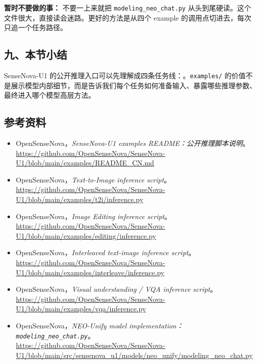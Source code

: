 \begin{warnbox}
\textbf{暂时不要做的事：} 不要一上来就把 \texttt{modeling\_neo\_chat.py} 从头到尾硬读。这个文件很大，直接读会迷路。更好的方法是从四个 example 的调用点切进去，每次只追一个任务路径。
\end{warnbox}

\subsection{九、本节小结}

\begin{summarybox}
SenseNova-U1 的公开推理入口可以先理解成四条任务线：。\texttt{examples/} 的价值不是展示模型内部细节，而是告诉我们每个任务如何准备输入、暴露哪些推理参数、最终进入哪个模型高层方法。
\end{summarybox}

\subsection{参考资料}

\begingroup
\small
\sloppy
\begin{itemize}[leftmargin=1.5em]
  \item OpenSenseNova，\emph{SenseNova-U1 examples README：公开推理脚本说明}。\\
  \url{https://github.com/OpenSenseNova/SenseNova-U1/blob/main/examples/README_CN.md}
  \item OpenSenseNova，\emph{Text-to-Image inference script}。\\
  \url{https://github.com/OpenSenseNova/SenseNova-U1/blob/main/examples/t2i/inference.py}
  \item OpenSenseNova，\emph{Image Editing inference script}。\\
  \url{https://github.com/OpenSenseNova/SenseNova-U1/blob/main/examples/editing/inference.py}
  \item OpenSenseNova，\emph{Interleaved text-image inference script}。\\
  \url{https://github.com/OpenSenseNova/SenseNova-U1/blob/main/examples/interleave/inference.py}
  \item OpenSenseNova，\emph{Visual understanding / VQA inference script}。\\
  \url{https://github.com/OpenSenseNova/SenseNova-U1/blob/main/examples/vqa/inference.py}
  \item OpenSenseNova，\emph{NEO-Unify model implementation：\texttt{modeling\_neo\_chat.py}}。\\
  \url{https://github.com/OpenSenseNova/SenseNova-U1/blob/main/src/sensenova_u1/models/neo_unify/modeling_neo_chat.py}
\end{itemize}
\endgroup
